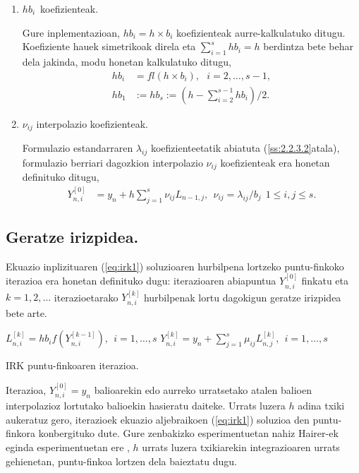 \begin{enumerate}
\item $hb_{i}$~koefizienteak.

Gure inplementazioan, $hb_i=h \times b_i$ koefizienteak aurre-kalkulatuko ditugu. Koefiziente hauek simetrikoak direla eta  $\sum\limits_{i=1}^{s} hb_i=h$ berdintza bete behar dela jakinda, modu honetan kalkulatuko ditugu,
\begin{align*}
hb_i & = fl(h \times b_i), \ \ \ i=2,\dots,s-1, \\
hb_1 & :=hb_s:= \left(h - \sum\limits_{i=2}^{s-1} hb_i \right)/2.
\end{align*}

\item $\nu_{ij}$ interpolazio koefizienteak.

Formulazio estandarraren $\lambda_{ij}$ koefizienteetatik abiatuta (\ref{ss:2.2.3.2}atala), formulazio berriari dagozkion interpolazio $\nu_{ij}$ koefizienteak era honetan definituko ditugu,
\begin{align}
\label{eq: interpLi}
Y_{n,i}^{[0]} &= y_n+ h \sum\limits_{j=1}^{s} \nu_{ij} L_{n-1,j}, \ \ \nu_{ij}=\lambda_{ij}/b_j \ \ 1\leqslant i,j \leqslant s.
\end{align} 

\end{enumerate}

\subsection{Geratze irizpidea.}

Ekuazio inplizituaren (\ref{eq:irk1}) soluzioaren hurbilpena lortzeko puntu-finkoko iterazioa era honetan definituko dugu: iterazioaren abiapuntua $Y_{n,i}^{[0]}$  finkatu eta $k=1,2,\dots$ iterazioetarako $Y_{n,i}^{[k]}$ hurbilpenak lortu dagokigun geratze irizpidea bete arte.


\begin{algorithm}[H]
  {
  \BlankLine
   $L_{n,i}^{[k]}=hb_if(Y_{n,i}^{[k-1]}), \ \  i=1,\dots,s $\;
   $Y_{n,i}^{[k]}=y_n+\sum\limits_{j=1}^{s} \mu_{ij} L_{n,j}^{[k]} , \ \  i=1,\dots,s $\; 
   }
 \caption{IRK puntu-finkoaren iterazioa.}
 \label{alg:pf}
\end{algorithm}
 
Iterazioa,  $Y_{n,i}^{[0]}=y_n$ balioarekin edo aurreko urratsetako atalen balioen interpolazioz lortutako balioekin \cite{Hairer2006}  hasieratu daiteke.  Urrats luzera $h$ adina txiki aukeratuz gero, iterazioek ekuazio aljebraikoen (\ref{eq:irk1}) soluzioa den puntu-finkora konbergituko dute. Gure zenbakizko esperimentuetan nahiz Hairer-ek eginda esperimentuetan ere \cite{Hairer2008}, $h$ urrats luzera txikiarekin integrazioaren urrats gehienetan, puntu-finkoa lortzen dela baieztatu dugu.    
 
